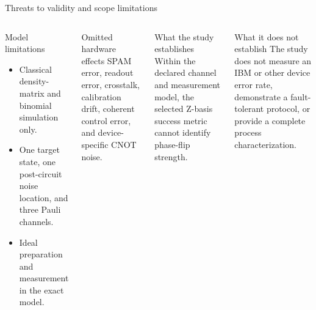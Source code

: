 \documentclass[10pt,aspectratio=169]{beamer}
\newcommand{\sourcefoot}[1]{}
\begin{document}
\begin{frame}[t]{Threats to validity and scope limitations}
\begin{columns}[T]
\begin{block}{Model limitations}
\begin{itemize}
  \item Classical density-matrix and binomial simulation only.
  \item One target state, one post-circuit noise location, and three Pauli channels.
  \item Ideal preparation and measurement in the exact model.
\end{itemize}
\end{block}
\begin{block}{Omitted hardware effects}
SPAM error, readout error, crosstalk, calibration drift, coherent control error, and device-specific CNOT noise.
\end{block}
\begin{block}{What the study establishes}
Within the declared channel and measurement model, the selected Z-basis success metric cannot identify phase-flip strength.
\end{block}
\begin{alertblock}{What it does not establish}
The study does not measure an IBM or other device error rate, demonstrate a fault-tolerant protocol, or provide a complete process characterization.
\end{alertblock}
\end{columns}
\sourcefoot{Detailed audit and claim boundaries: \texttt{docs/self\_audit.md} and \texttt{paper/main.tex}, Discussion.}
\end{frame}
\end{document}
